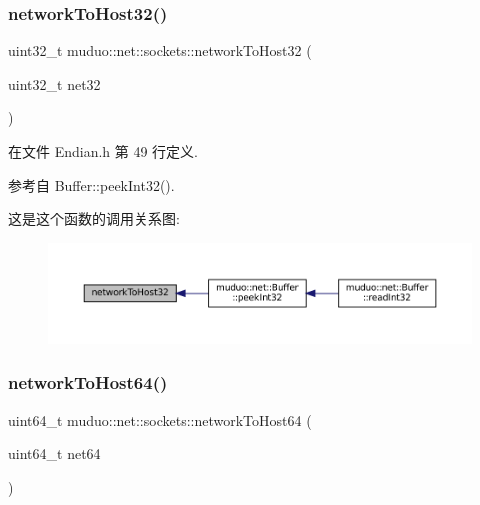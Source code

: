 \subsubsection{\texorpdfstring{network\+To\+Host32()}{networkToHost32()}}
{\footnotesize\ttfamily uint32\+\_\+t muduo\+::net\+::sockets\+::network\+To\+Host32 (\begin{DoxyParamCaption}\item[{uint32\+\_\+t}]{net32 }\end{DoxyParamCaption})\hspace{0.3cm}{\ttfamily [inline]}}



在文件 Endian.\+h 第 49 行定义.



参考自 Buffer\+::peek\+Int32().

这是这个函数的调用关系图\+:
\nopagebreak
\begin{figure}[H]
\begin{center}
\leavevmode
\includegraphics[width=350pt]{namespacemuduo_1_1net_1_1sockets_a23f7d77e0379e52b1390e1d2846624e0_icgraph}
\end{center}
\end{figure}
\mbox{\label{namespacemuduo_1_1net_1_1sockets_a590d67f0a8d4f8ff19462c08ebfb99b0}} 
\subsubsection{\texorpdfstring{network\+To\+Host64()}{networkToHost64()}}
{\footnotesize\ttfamily uint64\+\_\+t muduo\+::net\+::sockets\+::network\+To\+Host64 (\begin{DoxyParamCaption}\item[{uint64\+\_\+t}]{net64 }\end{DoxyParamCaption})\hspace{0.3cm}{\ttfamily [inline]}}



